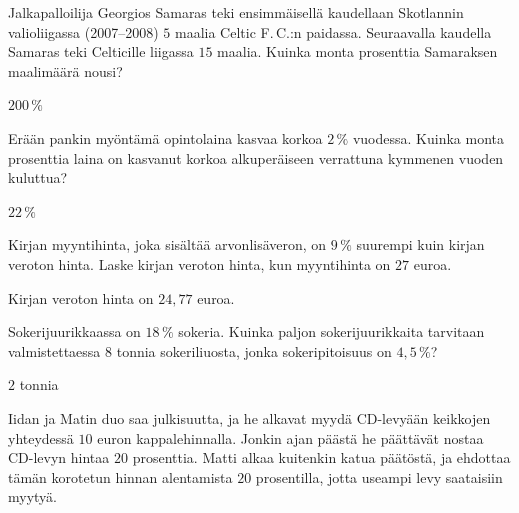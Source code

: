 \begin{tehtavasivu}
\begin{tehtava}
    Jalkapalloilija Georgios Samaras teki ensimmäisellä kaudellaan Skotlannin valioliigassa (2007--2008) $5$ maalia Celtic F.\,C.:n paidassa. Seuraavalla kaudella Samaras teki Celticille liigassa $15$ maalia. Kuinka monta prosenttia Samaraksen maalimäärä nousi?
    \begin{vastaus}
        $200\,\%$
    \end{vastaus}
\end{tehtava}

\begin{tehtava}
    Erään pankin myöntämä opintolaina kasvaa korkoa $2\,\%$ vuodessa. Kuinka monta prosenttia laina on kasvanut korkoa alkuperäiseen verrattuna kymmenen vuoden kuluttua?
    \begin{vastaus}
        $22\,\%$
    \end{vastaus}
\end{tehtava}

\begin{tehtava}
    Kirjan myyntihinta, joka sisältää arvonlisäveron, on $9\,\%$ suurempi kuin kirjan veroton hinta. Laske kirjan veroton hinta, kun myyntihinta on $27$ euroa.
    \begin{vastaus}
        Kirjan veroton hinta on $24,77$ euroa.
    \end{vastaus}
\end{tehtava}

\begin{tehtava}
    Sokerijuurikkaassa on $18\,\%$ sokeria. Kuinka paljon sokerijuurikkaita tarvitaan valmistettaessa $8$ tonnia sokeriliuosta, jonka sokeripitoisuus on $4,5\,\%$?
    \begin{vastaus}
        $2$ tonnia
    \end{vastaus}
\end{tehtava}

\begin{tehtava}
    Iidan ja Matin duo saa julkisuutta, ja he alkavat myydä CD-levyään keikkojen yhteydessä $10$ euron kappalehinnalla. Jonkin ajan päästä he päättävät nostaa CD-levyn hintaa $20$ prosenttia. Matti alkaa kuitenkin katua päätöstä, ja ehdottaa tämän korotetun hinnan alentamista $20$ prosentilla, jotta useampi levy saataisiin myytyä.
    \begin{vastaus}
    \end{vastaus}
\end{tehtava}


\end{tehtavasivu}
